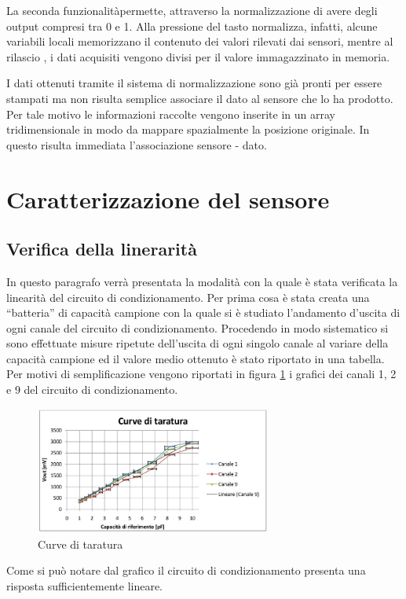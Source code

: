 \documentclass[12pt,a4paper,oneside,openright,italian]{article}
\begin{document}
La seconda funzionalit\`apermette, attraverso la normalizzazione di avere degli output compresi tra 0 e 1. 
Alla pressione del tasto normalizza, infatti, alcune variabili locali memorizzano il contenuto dei valori rilevati dai sensori, mentre al rilascio , i dati acquisiti vengono divisi per il valore immagazzinato in memoria.

I dati ottenuti tramite il sistema di normalizzazione sono gi\`a pronti per essere stampati ma non risulta semplice associare il dato al sensore che lo ha prodotto. Per tale motivo le informazioni raccolte vengono inserite in un array tridimensionale in modo da mappare spazialmente la posizione originale. In questo risulta immediata l'associazione sensore - dato.
\newpage
\section{Caratterizzazione del sensore}
\subsection{Verifica della linerarit\`a}
In questo paragrafo verr\`a presentata la modalit\`a con la quale \`e stata verificata la linearit\`a del circuito di condizionamento. Per prima cosa \`e stata creata una ``batteria'' di capacit\`a campione con la quale si \`e studiato l'andamento d'uscita di ogni canale del circuito di condizionamento. Procedendo in modo sistematico si sono effettuate misure ripetute dell'uscita di ogni singolo canale al variare della capacit\`a campione ed il valore medio ottenuto \`e stato riportato in una tabella. Per motivi di semplificazione vengono riportati in figura \ref{taratura} i grafici dei canali 1, 2 e 9 del circuito di condizionamento.

\begin{figure}[!hbp]
  \centering
  \includegraphics[width=220pt]{immagini/taratura.jpg}
  \caption{Curve di taratura}
  \label{taratura}
\end{figure}

Come si pu\`o notare dal grafico il circuito di condizionamento presenta una risposta sufficientemente lineare.
\end{document}
